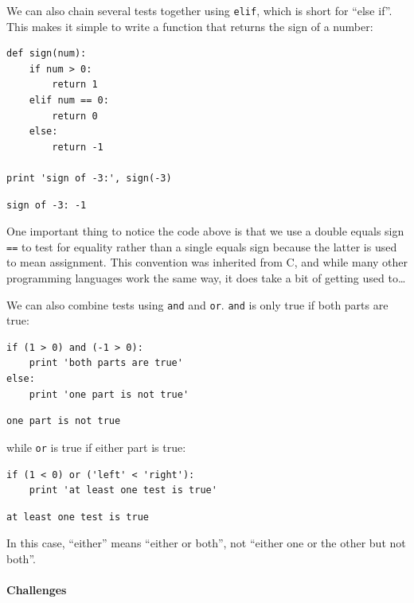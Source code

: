 \documentclass{book}
\begin{document}
We can also chain several tests together using \texttt{elif}, which is
short for ``else if''. This makes it simple to write a function that
returns the sign of a number:

\begin{verbatim}
def sign(num):
    if num > 0:
        return 1
    elif num == 0:
        return 0
    else:
        return -1

print 'sign of -3:', sign(-3)
\end{verbatim}

\begin{verbatim}
sign of -3: -1
\end{verbatim}

One important thing to notice the code above is that we use a double
equals sign \texttt{==} to test for equality rather than a single equals
sign because the latter is used to mean assignment. This convention was
inherited from C, and while many other programming languages work the
same way, it does take a bit of getting used to\ldots{}

We can also combine tests using \texttt{and} and \texttt{or}.
\texttt{and} is only true if both parts are true:

\begin{verbatim}
if (1 > 0) and (-1 > 0):
    print 'both parts are true'
else:
    print 'one part is not true'
\end{verbatim}

\begin{verbatim}
one part is not true
\end{verbatim}

while \texttt{or} is true if either part is true:

\begin{verbatim}
if (1 < 0) or ('left' < 'right'):
    print 'at least one test is true'
\end{verbatim}

\begin{verbatim}
at least one test is true
\end{verbatim}

In this case, ``either'' means ``either or both'', not ``either one or
the other but not both''.

\mbox{}\paragraph{Challenges}
\end{document}
